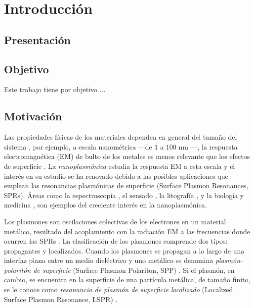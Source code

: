 \chapter*{Introducción}

%

\section*{Presentación} %
\blindtext



\section*{Objetivo}

Este trabajo tiene por objetivo ...
\blindtext


\section*{Motivación}
\label{section:Motivacion}

Las propiedades f\'isicas de los materiales dependen en general del tamaño del sistema \cite{boverhof2015comparative}, por ejemplo, a escala nanom\'etrica ---de $1$ a $100$ nm \cite{boverhof2015comparative}---, la respuesta electromagn\'etica (EM) de bulto de los metales es menos relevante que los efectos de superficie \cite{zhao2008methods}.  La \emph{nanoplasm\'onica} estudia la respuesta EM a esta escala y el inter\'es en su estudio se ha renovado debido a las posibles aplicaciones que emplean las resonancias plasm\'onicas de superficie (Surface Plasmon Resonances, SPRs).  Áreas como la espectroscop\'ia \cite{novotny2006principles}, el sensado \cite{jain2008noble}, la litograf\'ia \cite{stockman2011nanoplasmonics}, y la biolog\'ia y  medicina \cite{jain2008noble}, son ejemplos del creciente interés en la nanoplasmónica. 

Los plasmones son oscilaciones colectivas de los electrones en un material metálico,  resultado del  acoplamiento con la radiaci\'on EM a las frecuencias donde ocurren las SPRs \cite{stockman2011nanoplasmonics}.  La clasificación de los plasmones comprende  dos tipos: propagantes y localizados.  Cuando los plasmones se propagan a lo largo de una interfaz plana entre un medio diel\'ectrico y uno met\'alico se denomina  \emph{plasm\'on-polarit\'on de superficie} (Surface Plasmon Polariton, SPP) \cite{maier2007plasmonics}.  Si el plasmón, en cambio, se encuentra en la superficie de una partícula  met\'alica, de tamaño finito, se le conoce como \emph{resonancia de plasm\'on de superficie localizado} (Localized Surface Plasmon Resonance, LSPR) \cite{maier2007plasmonics}. 

